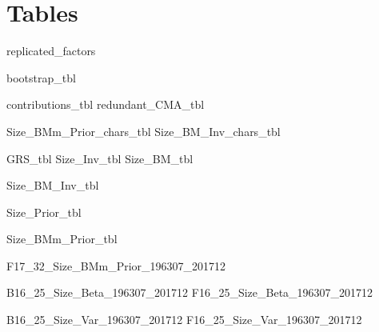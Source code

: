 
\section{Tables} \label{sec:tables}


{replicated_factors}

\begin{landscape}
{bootstrap_tbl}
\end{landscape}
{contributions_tbl}
{redundant_CMA_tbl}

{Size_BMm_Prior_chars_tbl}
{Size_BM_Inv_chars_tbl}

{GRS_tbl}
{Size_Inv_tbl}
{Size_BM_tbl}
\begin{landscape}
{Size_BM_Inv_tbl}
\end{landscape}
{Size_Prior_tbl}
\begin{landscape}
{Size_BMm_Prior_tbl}
\end{landscape}
\begin{landscape}
{F17_32_Size_BMm_Prior_196307_201712}
\end{landscape}


{B16_25_Size_Beta_196307_201712}
{F16_25_Size_Beta_196307_201712}


{B16_25_Size_Var_196307_201712}
{F16_25_Size_Var_196307_201712}

